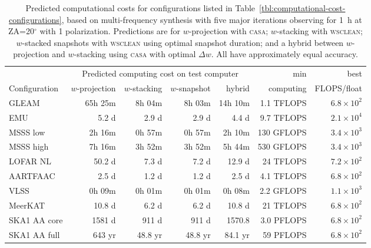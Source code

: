 \documentclass[useAMS,usenatbib]{mn2e}
\newcommand{\degree}{\ensuremath{^{\circ}}\xspace}
\begin{document}
\begin{table}
\caption{Predicted computational costs for configurations listed in Table~\ref{tbl:computational-cost-configurations}, based on multi-frequency synthesis with five major iterations observing for 1~h at ZA=20\degree with 1 polarization. Predictions are for $w$-projection with \textsc{casa}; $w$-stacking with \textsc{wsclean}; $w$-stacked snapshots with \textsc{wsclean} using optimal snapshot duration; and a hybrid between $w$-projection and $w$-stacking using \textsc{casa} with optimal $\Delta w$. All have approximately equal accuracy.} \label{tbl:computational-cost-predictions}
\begin{tabular}{l|rrrr|rr}
               & \multicolumn{4}{c|}{Predicted computing cost on test computer} & min & best \\
 Configuration & $w$-projection & $w$-stacking & $w$-snapshot & hybrid & computing & FLOPS/float \\
 \hline
 GLEAM    &  65h 25m & 8h 04m &  8h 03m & 14h 10m   & 1.1 TFLOPS & $6.8 \times 10^2$    \\
 EMU      &    5.2 d &  2.9 d &   2.9 d & 4.4 d     & 9.7 TFLOPS & $2.1 \times 10^4$      \\
 MSSS low &  2h 16m  & 0h 57m &  0h 57m & 2h 10m    & 130 GFLOPS & $3.4 \times 10^3$   \\
 MSSS high&  7h 16m  & 3h 52m &  3h 52m & 5h 44m    & 530 GFLOPS & $3.4 \times 10^3$   \\
 LOFAR NL &  50.2 d  &  7.3 d &   7.2 d & 12.9 d    &  24 TFLOPS & $7.2 \times 10^2$ \\
 AARTFAAC &  2.5 d   &  1.2 d &   1.2 d &   2.5 d   & 4.1 TFLOPS & $6.8 \times 10^2$   \\
 VLSS     &  0h 09m  & 0h 01m &  0h 01m &  0h 08m   & 2.2 GFLOPS & $1.1 \times 10^3$     \\
 MeerKAT  &   10.8 d &  6.2 d &   6.2 d &  10.8 d   &  21 TFLOPS & $6.8 \times 10^2$ \\
 SKA1 AA core&1581 d &  911 d &   911 d &  1570.8   & 3.0 PFLOPS & $6.8 \times 10^2$ \\
 SKA1 AA full& 643 yr& 48.8 yr & 48.8 yr& 84.1 yr   &  59 PFLOPS & $6.8 \times 10^2$ \\
\end{tabular}
\end{table}
\end{document}
